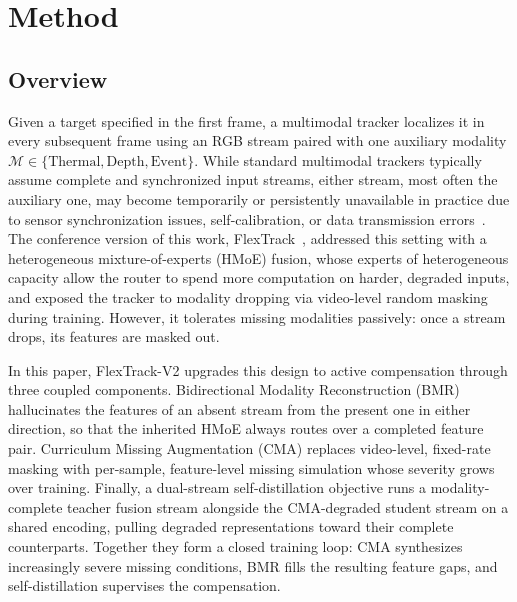 \section{Method}
\label{sec:method}

\subsection{Overview}
\label{subsec:overview}
Given a target specified in the first frame, a multimodal tracker localizes it in every subsequent frame using an RGB stream paired with one auxiliary modality $\mathcal{M}\!\in\!\{\text{Thermal},\text{Depth},\text{Event}\}$. 
While standard multimodal trackers typically assume complete and synchronized input streams, either stream, most often the auxiliary one, may become temporarily or persistently unavailable in practice due to sensor synchronization issues, self-calibration, or data transmission errors~\cite{lu2025modality,tan2025you}.
The conference version of this work, FlexTrack~\cite{tan2025you}, addressed this setting with a heterogeneous mixture-of-experts (HMoE) fusion, whose experts of heterogeneous capacity allow the router to spend more computation on harder, degraded inputs, and exposed the tracker to modality dropping via video-level random masking during training. However, it tolerates missing modalities passively: once a stream drops, its features are masked out.

In this paper, FlexTrack-V2 upgrades this design to active compensation through three coupled components. Bidirectional Modality Reconstruction (BMR) hallucinates the features of an absent stream from the present one in either direction, so that the inherited HMoE always routes over a completed feature pair.
Curriculum Missing Augmentation (CMA) replaces video-level, fixed-rate masking with per-sample, feature-level missing simulation whose severity grows over training.
Finally, a dual-stream self-distillation objective runs a modality-complete teacher fusion stream alongside the CMA-degraded student stream on a shared encoding, pulling degraded representations toward their complete counterparts.
Together they form a closed training loop: CMA synthesizes increasingly severe missing conditions, BMR fills the resulting feature gaps, and self-distillation supervises the compensation.

